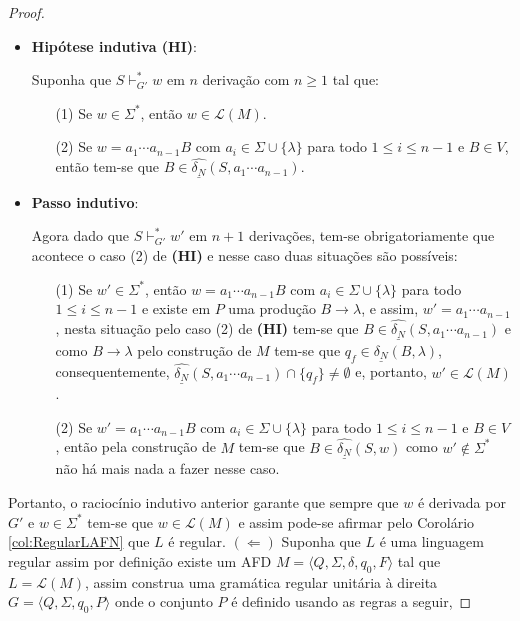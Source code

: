 \begin{proof}
\begin{itemize}
		
		\item \textbf{Hipótese indutiva (HI)}:
		
		Suponha que $S \vdash^*_{G'} w$ em $n$ derivação com $n \geq 1$ tal que:
		\begin{itemize}
			\item[(1)] Se $w \in \Sigma^*$, então $w \in \mathcal{L}(M)$.
			\item[(2)] Se $w = a_1\cdots a_{n-1}B$ com $a_i \in \Sigma \cup \{\lambda\}$ para todo $1 \leq i \leq n-1$ e $B \in V$, então tem-se que $B \in \widehat{\underline{\delta_N}}(S, a_1\cdots a_{n-1})$.
		\end{itemize}
		
		\item \textbf{Passo indutivo}:
		
		Agora dado que $S \vdash^*_{G'} w'$ em $n+1$ derivações, tem-se obrigatoriamente que acontece o caso (2) de \textbf{(HI)} e nesse caso duas situações são possíveis:
		\begin{itemize}
			\item[(1)] Se $w' \in \Sigma^*$, então $w = a_1\cdots a_{n-1}B$ com $a_i \in \Sigma \cup \{\lambda\}$ para todo $1 \leq i \leq n-1$ e existe em $P$ uma produção $B \rightarrow \lambda$, e assim, $w' = a_1\cdots a_{n-1}$, nesta situação pelo caso (2) de \textbf{(HI)} tem-se que $B \in \widehat{\underline{\delta_N}}(S, a_1\cdots a_{n-1})$ e como $B \rightarrow \lambda$ pelo construção de $M$ tem-se que $q_f \in \underline{\delta_N}(B, \lambda)$, consequentemente, $\widehat{\underline{\delta_N}}(S, a_1\cdots a_{n-1}) \cap \{q_f\} \neq \emptyset$ e, portanto, $w' \in \mathcal{L}(M)$.
			\item[(2)] Se $w' = a_1\cdots a_{n-1}B$ com $a_i \in \Sigma \cup \{\lambda\}$ para todo $1 \leq i \leq n-1$ e $B \in V$, então pela construção de $M$ tem-se que $B \in \widehat{\underline{\delta_N}}(S, w)$ como $w' \notin \Sigma^*$ não há mais nada a fazer nesse caso.
		\end{itemize}
	\end{itemize}
	Portanto, o raciocínio indutivo anterior garante que sempre que  $w$ é derivada por $G'$ e $w \in \Sigma^*$ tem-se que $w \in \mathcal{L}(M)$ e assim pode-se afirmar pelo Corolário \ref{col:RegularLAFN} que $L$ é regular. $(\Leftarrow)$ Suponha que $L$ é uma linguagem regular assim por definição existe um AFD $M = \langle Q, \Sigma, \delta, q_0, F \rangle$ tal que $L = \mathcal{L}(M)$, assim construa uma gramática regular unitária à direita $G = \langle Q, \Sigma, q_0, P \rangle$ onde o conjunto $P$ é definido usando as regras a seguir, 

\end{proof}

